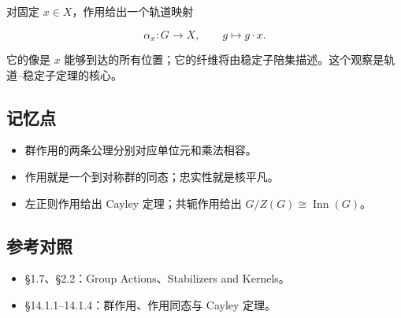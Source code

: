 对固定 $x\in X$，作用给出一个轨道映射

\[
\alpha_x:G\longrightarrow X,
\qquad g\longmapsto g\cdot x.
\]

它的像是 $x$ 能够到达的所有位置；它的纤维将由稳定子陪集描述。这个观察是轨道--稳定子定理的核心。

\subsection{记忆点}


\begin{itemize}
\item 群作用的两条公理分别对应单位元和乘法相容。
\item 作用就是一个到对称群的同态；忠实性就是核平凡。
\item 左正则作用给出 Cayley 定理；共轭作用给出 $G/Z(G)\cong\operatorname{Inn}(G)$。
\end{itemize}


\subsection{参考对照}


\begin{itemize}
\item [DF] §1.7、§2.2：Group Actions、Stabilizers and Kernels。
\item [DS] §14.1.1–14.1.4：群作用、作用同态与 Cayley 定理。
\end{itemize}
